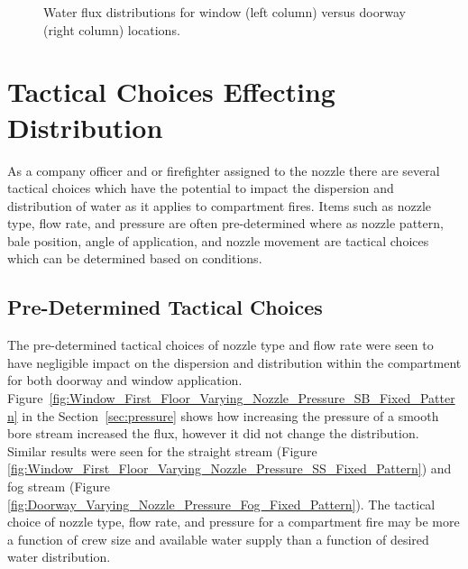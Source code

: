 \documentclass[12pt,oneside]{book}
\begin{document}
\begin{figure}[!ht]
\centering
{}
\caption[Doorway vs Window Application]{Water flux distributions for window (left column) versus doorway (right column) locations.}
\label{fig:Doorway_vs_Window}
\end{figure}

\section{Tactical Choices Effecting Distribution}

As a company officer and or firefighter assigned to the nozzle there are several tactical choices which have the potential to impact the dispersion and distribution of water as it applies to compartment fires. Items such as nozzle type, flow rate, and pressure are often pre-determined where as nozzle pattern, bale position, angle of application, and nozzle movement are tactical choices which can be determined based on conditions.  

\subsection{Pre-Determined Tactical Choices}
The pre-determined tactical choices of nozzle type and flow rate were seen to have negligible impact on the dispersion and distribution within the compartment for both doorway and window application. Figure~\ref{fig:Window_First_Floor_Varying_Nozzle_Pressure_SB_Fixed_Pattern} in the Section~\ref{sec:pressure} shows how increasing the pressure of a smooth bore stream increased the flux, however it did not change the distribution. Similar results were seen for the straight stream (Figure \ref{fig:Window_First_Floor_Varying_Nozzle_Pressure_SS_Fixed_Pattern}) and fog stream (Figure \ref{fig:Doorway_Varying_Nozzle_Pressure_Fog_Fixed_Pattern}). The tactical choice of nozzle type, flow rate, and pressure for a compartment fire may be more a function of crew size and available water supply than a function of desired water distribution. 
\end{document}
